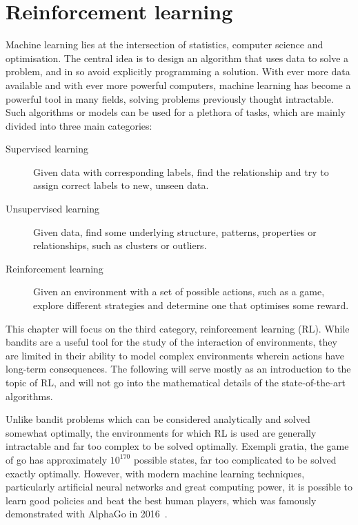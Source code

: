 \chapter{Reinforcement learning}
\label{chap:rl}

Machine learning lies at the intersection of statistics, computer science and optimisation.
The central idea is to design an algorithm that uses data to solve a problem, and in so avoid explicitly programming a solution.
With ever more data available and with ever more powerful computers, machine learning has become a powerful tool in many fields, solving problems previously thought intractable.
Such algorithms or models can be used for a plethora of tasks, which are mainly divided into three main categories:
\begin{description}

    \item[Supervised learning]
        Given data with corresponding labels, find the relationship and try to assign correct labels to new, unseen data.

    \item[Unsupervised learning]
        Given data, find some underlying structure, patterns, properties or relationships, such as clusters or outliers.

    \item[Reinforcement learning]
        Given an environment with a set of possible actions, such as a game, explore different strategies and determine one that optimises some reward.

\end{description}

This chapter will focus on the third category, reinforcement learning (RL).
While bandits are a useful tool for the study of the interaction of environments, they are limited in their ability to model complex environments wherein actions have long-term consequences.
The following will serve mostly as an introduction to the topic of RL, and will not go into the mathematical details of the state-of-the-art algorithms.

Unlike bandit problems which can be considered analytically and solved somewhat optimally, the environments for which RL is used are generally intractable and far too complex to be solved optimally.
Exempli gratia, the game of go has approximately $10^{170}$ possible states, far too complicated to be solved exactly optimally.
However, with modern machine learning techniques, particularly artificial neural networks and great computing power, it is possible to learn good policies and beat the best human players, which was famously demonstrated with AlphaGo in 2016~\autocite{silver2016}.


